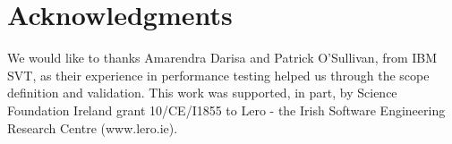 \documentclass[runningheads,a4paper]{llncs}
\begin{document}
\vspace{-8pt}
\section*{Acknowledgments}
\vspace{-7pt}
We would like to thanks Amarendra Darisa and Patrick O'Sullivan, from IBM SVT,
as their experience in performance testing helped us through the scope
definition and validation. This work was supported, in part, by Science
Foundation Ireland grant 10/CE/I1855 to Lero - the Irish Software Engineering
Research Centre (www.lero.ie).

\vspace{-8pt}



\end{document}
